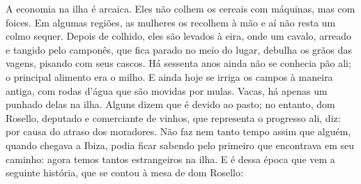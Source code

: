 A economia na ilha é arcaica. Eles não colhem os cereais com máquinas,
mas com foices. Em algumas regiões, as mulheres os recolhem à mão e aí
não resta um colmo sequer. Depois de colhido, eles são levados à eira,
onde um cavalo, arreado e tangido pelo camponês, que fica parado no meio
do lugar, debulha os grãos das vagens, pisando com seus cascos. Há
sessenta anos ainda não se conhecia pão ali; o principal alimento era o
milho. E ainda hoje se irriga os campos à maneira antiga, com rodas
d'água que são movidas por mulas. Vacas, há apenas um punhado delas na
ilha. Alguns dizem que é devido ao pasto; no entanto, dom Rosello,
deputado e comerciante de vinhos, que representa o progresso ali, diz:
por causa do atraso dos moradores. Não faz nem tanto tempo assim que
alguém, quando chegava a Ibiza, podia ficar sabendo pelo primeiro que
encontrava em seu caminho: agora temos tantos estrangeiros na ilha. E é
dessa época que vem a seguinte história, que se contou à mesa de dom
Rosello:

